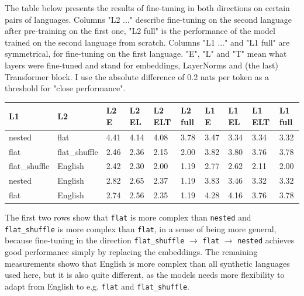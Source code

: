 \documentclass[a4paper, 11pt, oneside]{article}
\begin{document}
	The table below presents the results of fine-tuning in both directions on
	certain pairs of languages. Columns "L2 ..." describe fine-tuning on the second
	language after pre-training on the first one, "L2 full" is the performance of
	the model trained on the second language from scratch. Columns "L1 ..." and "L1
	full" are symmetrical, for fine-tuning on the first language. "E", "L" and "T"
	mean what layers were fine-tuned and stand for embeddings, LayerNorms and (the
	last) Transformer block. I use the absolute difference of 0.2 nats per token
	as a threshold for "close performance".

	\begin{table}[ht]
		\centering
		\begin{tabular}{|p{45pt}|p{45pt}|p{20pt}|p{20pt}|p{20pt}|p{20pt}|p{20pt}|p{20pt}|p{20pt}|p{20pt}|}
			\hline
			\textbf{L1}   & \textbf{L2}   & \textbf{L2 E} & \textbf{L2 EL} & \textbf{L2 ELT} & \textbf{L2 full} & \textbf{L1 E} & \textbf{L1 EL} & \textbf{L1 ELT} & \textbf{L1 full} \\
			\hline
			nested        & flat          & 4.41          & 4.14           & 4.08            & 3.78             & 3.47          & 3.34           & 3.34            & 3.32             \\
			\hline
			flat          & flat\_shuffle & 2.46          & 2.36           & 2.15            & 2.00             & 3.82          & 3.80           & 3.76            & 3.78             \\
			\hline
			flat\_shuffle & English       & 2.42          & 2.30           & 2.00            & 1.19             & 2.77          & 2.62           & 2.11            & 2.00             \\
			\hline
			nested        & English       & 2.82          & 2.65           & 2.37            & 1.19             & 3.83          & 3.46           & 3.32            & 3.32             \\
			\hline
			flat          & English       & 2.74          & 2.56           & 2.35            & 1.19             & 4.28          & 4.16           & 3.76            & 3.78             \\
			\hline
		\end{tabular}
	\end{table}

	The first two rows show that \texttt{flat} is more complex than \texttt{nested}
	and \texttt{flat\_shuffle} is more complex than \texttt{flat}, in a sense of
	being more general, because fine-tuning in the direction \texttt{flat\_shuffle}
	$\to$ \texttt{flat} $\to$ \texttt{nested} achieves good performance simply by
	replacing the embeddings. The remaining measurements showo that English is more
	complex than all synthetic languages used here, but it is also quite different,
	as the models needs more flexibility to adapt from English to e.g. \texttt{flat}
	and \texttt{flat\_shuffle}.
\end{document}
